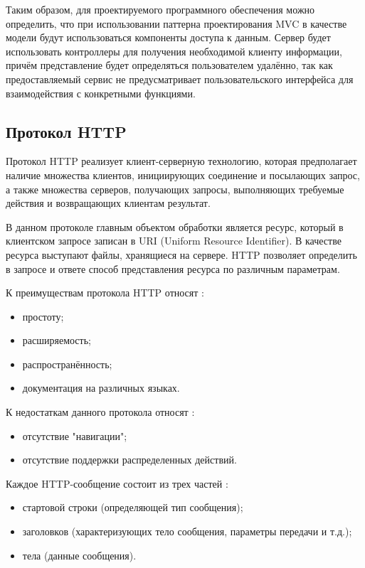 Таким образом, для проектируемого программного обеспечения можно определить, что при использовании паттерна проектирования MVC в качестве модели будут использоваться компоненты доступа к данным. Сервер будет использовать контроллеры для получения необходимой клиенту информации, причём представление будет определяться пользователем удалённо, так как предоставляемый сервис не предусматривает пользовательского интерфейса для взаимодействия с конкретными функциями.

\subsection{Протокол HTTP}
Протокол HTTP реализует клиент-серверную технологию, которая предполагает наличие множества клиентов, инициирующих соединение и посылающих запрос, а также множества серверов, получающих запросы, выполняющих требуемые действия и возвращающих клиентам результат. \cite{http}

В данном протоколе главным объектом обработки является ресурс, который в клиентском запросе записан в URI (Uniform Resource Identifier). В качестве ресурса выступают файлы, хранящиеся на сервере. HTTP позволяет определить в запросе и ответе способ представления ресурса по различным параметрам. \cite{http}

К преимуществам протокола HTTP относят \cite{http}:
\begin{itemize}[leftmargin=1.6\parindent]
\item простоту;
\item расширяемость;
\item распространённость;
\item документация на различных языках.
\end{itemize}

К недостаткам данного протокола относят \cite{http}:
\begin{itemize}[leftmargin=1.6\parindent]
\item отсутствие "навигации";
\item отсутствие поддержки распределенных действий.
\end{itemize}

Каждое HTTP-сообщение состоит из трех частей \cite{http11}:
\begin{itemize}[leftmargin=1.6\parindent]
\item стартовой строки (определяющей тип сообщения);
\item заголовков (характеризующих тело сообщения, параметры передачи и т.д.);
\item тела (данные сообщения).
\end{itemize}

